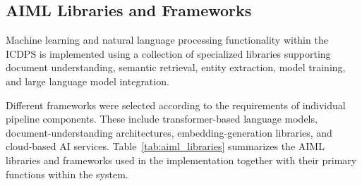 \subsection{AIML Libraries and Frameworks}

Machine learning and natural language processing functionality within the ICDPS is implemented using a collection of specialized libraries supporting document understanding, semantic retrieval, entity extraction, model training, and large language model integration.

Different frameworks were selected according to the requirements of individual pipeline components. These include transformer-based language models, document-understanding architectures, embedding-generation libraries, and cloud-based AI services. Table~\ref{tab:aiml_libraries} summarizes the AIML libraries and frameworks used in the implementation together with their primary functions within the system.


